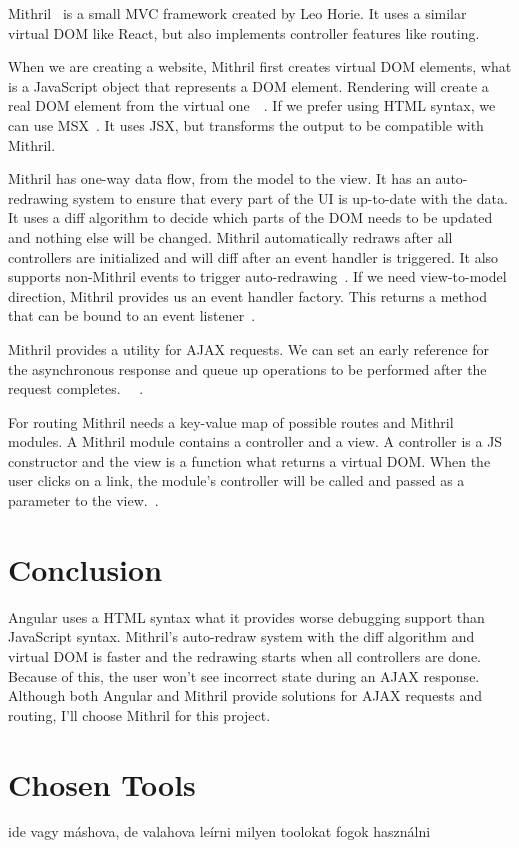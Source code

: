 Mithril~\cite{Mithril} is a small MVC framework created by Leo Horie. It uses a similar virtual DOM like React, but also implements controller features like routing.

When we are creating a website, Mithril first creates virtual DOM elements, what is a JavaScript object that represents a DOM element. Rendering will create a real DOM element from the virtual one~\cite{Mithril-m}~\cite{Mithril-render}. If we prefer using HTML syntax, we can use MSX~\cite{MSX}. It uses JSX, but transforms the output to be compatible with Mithril. 

Mithril has one-way data flow, from the model to the view. It has an auto-redrawing system to ensure that every part of the UI is up-to-date with the data. It uses a diff algorithm to decide which parts of the DOM needs to be updated and nothing else will be changed. Mithril automatically redraws after all controllers are initialized and will diff after an event handler is triggered. It also supports non-Mithril events to trigger auto-redrawing~\cite{Mithril-redraw}. If we need view-to-model direction, Mithril provides us an event handler factory. This returns a method that can be bound to an event listener~\cite{Mithril-withAttr}.


Mithril provides a utility for AJAX requests. We can set an early reference for the asynchronous response and queue up operations to be performed after the request completes.  ~\cite{Mithril-webservice}~\cite{Mithril-request}.


For routing Mithril needs a key-value map of possible routes and Mithril modules. A Mithril module contains a controller and a view. A controller is a JS constructor and the view is a function what returns a virtual DOM. When the user clicks on a link, the module's controller will be called and passed as a parameter to the view.~\cite{Mithril-routing}.

\section{Conclusion}


Angular uses a HTML syntax what it provides worse debugging support than JavaScript syntax. Mithril's auto-redraw system with the diff algorithm and virtual DOM is faster and the redrawing starts when all controllers are done. Because of this, the user won't see incorrect state during an AJAX response. Although both Angular and Mithril provide solutions for AJAX requests and routing, I'll choose Mithril for this project. 


\section{Chosen Tools}
ide vagy máshova, de valahova leírni milyen toolokat fogok használni
